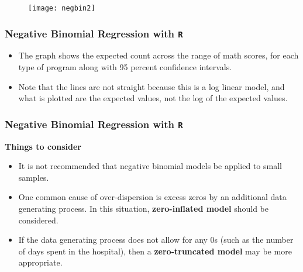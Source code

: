 \documentclass[00-GLMregslides.tex]{subfiles}
\begin{document}
\begin{frame}
\begin{figure}
\centering
\texttt{[image: negbin2]}
\caption{}
\label{fig:negbin2}
\end{figure}
	
\end{frame}
%		
%			
%			
%		
\begin{frame}[fragile]
	\frametitle{Negative Binomial Regression with \texttt{R} }
	\Large
	\begin{itemize}
\item The graph shows the expected count across the range of math scores, for each type of program along with 95 percent confidence intervals. 
\item Note that the lines are not straight because this is a log linear model, and what is plotted are the expected values, not the log of the expected values.
\end{itemize}
\end{frame}



\begin{frame}[fragile]
	\frametitle{Negative Binomial Regression with \texttt{R} }
	\Large
	
	\textbf{Things to consider}
	\begin{itemize}
	\item It is not recommended that negative binomial models be applied to small samples.
	\item One common cause of over-dispersion is excess zeros by an additional data generating process. 
	In this situation, \textbf{zero-inflated model} should be considered.
	\item	
	If the data generating process does not allow for any 0s (such as the number of days spent in the hospital), then a \textbf{zero-truncated model} may be more appropriate.
	\end{itemize}
\end{frame}
\end{document}
